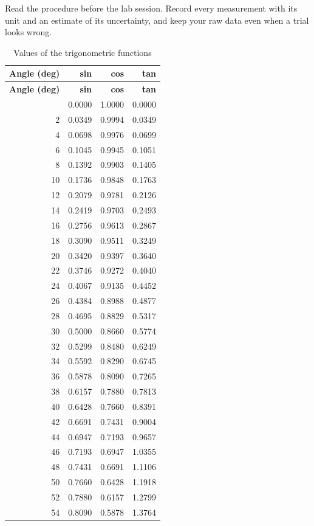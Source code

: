 \documentclass[11pt]{article}
\begin{document}
Read the procedure before the lab session. Record every measurement with its unit and an estimate of its uncertainty, and keep your raw data even when a trial looks wrong. 
\begin{longtable}{rrrr}
\caption{Values of the trigonometric functions}\\
\toprule
\textbf{Angle (deg)} & \textbf{sin} & \textbf{cos} & \textbf{tan} \\
\midrule
\endfirsthead
\toprule
\textbf{Angle (deg)} & \textbf{sin} & \textbf{cos} & \textbf{tan} \\
\midrule
\endhead
\bottomrule
\endfoot
0 & 0.0000 & 1.0000 & 0.0000 \\
2 & 0.0349 & 0.9994 & 0.0349 \\
4 & 0.0698 & 0.9976 & 0.0699 \\
6 & 0.1045 & 0.9945 & 0.1051 \\
8 & 0.1392 & 0.9903 & 0.1405 \\
10 & 0.1736 & 0.9848 & 0.1763 \\
12 & 0.2079 & 0.9781 & 0.2126 \\
14 & 0.2419 & 0.9703 & 0.2493 \\
16 & 0.2756 & 0.9613 & 0.2867 \\
18 & 0.3090 & 0.9511 & 0.3249 \\
20 & 0.3420 & 0.9397 & 0.3640 \\
22 & 0.3746 & 0.9272 & 0.4040 \\
24 & 0.4067 & 0.9135 & 0.4452 \\
26 & 0.4384 & 0.8988 & 0.4877 \\
28 & 0.4695 & 0.8829 & 0.5317 \\
30 & 0.5000 & 0.8660 & 0.5774 \\
32 & 0.5299 & 0.8480 & 0.6249 \\
34 & 0.5592 & 0.8290 & 0.6745 \\
36 & 0.5878 & 0.8090 & 0.7265 \\
38 & 0.6157 & 0.7880 & 0.7813 \\
40 & 0.6428 & 0.7660 & 0.8391 \\
42 & 0.6691 & 0.7431 & 0.9004 \\
44 & 0.6947 & 0.7193 & 0.9657 \\
46 & 0.7193 & 0.6947 & 1.0355 \\
48 & 0.7431 & 0.6691 & 1.1106 \\
50 & 0.7660 & 0.6428 & 1.1918 \\
52 & 0.7880 & 0.6157 & 1.2799 \\
54 & 0.8090 & 0.5878 & 1.3764 \\

\end{longtable}
\end{document}
